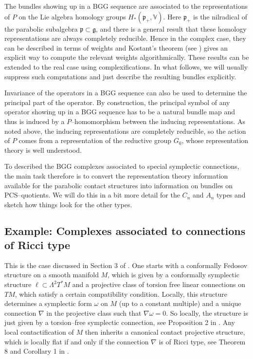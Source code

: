 \documentclass[12pt,a4paper]{amsart}
\def\frak{\mathfrak}
\def\Bbb{\mathbb}
\newcommand{\om}{\omega}
\newcommand{\La}{\Lambda}
\newcounter{theorem}
\numberwithin{theorem}{section}
\theoremstyle{definition}
\theoremstyle{remark}
\begin{document}
The bundles showing up in a BGG sequence are associated to the
representations of $P$ on the Lie algebra homology groups $H_*(\frak
p_+,\Bbb V)$. Here $\frak p_+$ is the nilradical of the parabolic
subalgebra $\frak p\subset\frak g$, and there is a general result that
these homology representations are always completely reducible. Hence
in the complex case, they can be described in terms of weights and
Kostant's theorem (see \cite{Kostant}) gives an explicit way to
compute the relevant weights algorithmically. These results can be
extended to the real case using complexifications. In what follows, we
will usually suppress such computations and just describe the
resulting bundles explicitly.

Invariance of the operators in a BGG sequence can also be used to
determine the principal part of the operator. By construction, the
principal symbol of any operator showing up in a BGG sequence has to
be a natural bundle map and thus is induced by a $P$--homomorphism 
between the inducing representations. As noted above, the inducing
representations are completely reducible, so the action of $P$ comes
from a representation of the reductive group $G_0$, whose
representation theory is well understood. 

To described the BGG complexes associated to special symplectic
connections, the main task therefore is to convert the representation
theory information available for the parabolic contact structures into
information on bundles on PCS--quotients. We will do this in a bit
more detail for the $C_n$ and $A_n$ types and sketch how things look
for the other types. 

\subsection{Example: Complexes associated to connections of Ricci
  type}\label{3.2}  

This is the case discussed in Section 3 of \cite{PCS2}. One starts
with a conformally Fedosov structure on a smooth manifold $M$, which
is given by a conformally symplectic structure $\ell\subset \La^2T^*M$
and a projective class of torsion free linear connections on $TM$,
which satisfy a certain compatibility condition. Locally, this
structure determines a symplectic form $\om$ on $M$ (up to a constant
multiple) and a unique connection $\nabla$ in the projective class
such that $\nabla\om=0$. So locally, the structure is just given by a
torsion--free symplectic connection, see Proposition 2 in
\cite{PCS2}. Any local contactification of $M$ then inherits a
canonical contact projective structure, which is locally flat if and
only if the connection $\nabla$ is of Ricci type, see Theorem 8 and
Corollary 1 in \cite{PCS2}.
\end{document}
